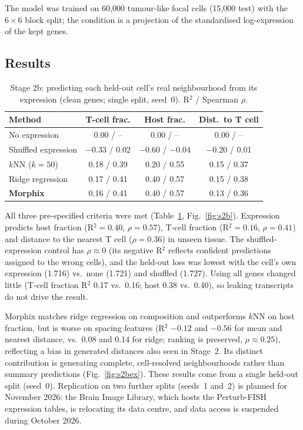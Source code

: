 \documentclass[journal]{IEEEtran}
\begin{document}
The model was trained on 60{,}000 tumour-like focal cells (15{,}000 test) with the $6\times6$ block split; the condition is a projection of the standardised log-expression of the kept genes.

\subsection{Results}

\begin{table}[!t]
\centering
\caption{Stage 2b: predicting each held-out cell's real neighbourhood from its expression (clean genes; single split, seed~0). R$^2$ / Spearman $\rho$.}
\label{tab:s2b}
\footnotesize
\setlength{\tabcolsep}{3pt}
\begin{tabular}{lccc}
\toprule
Method & T-cell frac. & Host frac. & Dist.\ to T cell \\
\midrule
No expression       & 0.00 / -- & 0.00 / -- & 0.00 / -- \\
Shuffled expression & $-0.33$ / 0.02 & $-0.60$ / $-0.04$ & $-0.20$ / 0.01 \\
$k$NN ($k=50$)      & 0.18 / 0.39 & 0.20 / 0.55 & 0.15 / 0.37 \\
Ridge regression    & 0.17 / 0.41 & 0.40 / 0.57 & 0.15 / 0.38 \\
\textbf{Morphix}    & 0.16 / 0.41 & 0.40 / 0.57 & 0.13 / 0.36 \\
\bottomrule
\end{tabular}
\end{table}

All three pre-specified criteria were met (Table~\ref{tab:s2b}, Fig.~\ref{fig:s2b}). Expression predicts host fraction (R$^2=0.40$, $\rho=0.57$), T-cell fraction (R$^2=0.16$, $\rho=0.41$) and distance to the nearest T cell ($\rho=0.36$) in unseen tissue. The shuffled-expression control has $\rho\approx0$ (its negative R$^2$ reflects confident predictions assigned to the wrong cells), and the held-out loss was lowest with the cell's own expression (1.716) vs.\ none (1.721) and shuffled (1.727). Using all genes changed little (T-cell fraction R$^2$ 0.17 vs.\ 0.16; host 0.38 vs.\ 0.40), so leaking transcripts do not drive the result.

Morphix matches ridge regression on composition and outperforms $k$NN on host fraction, but is worse on spacing features (R$^2$ $-0.12$ and $-0.56$ for mean and nearest distance, vs.\ 0.08 and 0.14 for ridge; ranking is preserved, $\rho\approx0.25$), reflecting a bias in generated distances also seen in Stage~2. Its distinct contribution is generating complete, cell-resolved neighbourhoods rather than summary predictions (Fig.~\ref{fig:s2bex}). These results come from a single held-out split (seed~0). Replication on two further splits (seeds~1 and~2) is planned for November 2026: the Brain Image Library, which hosts the Perturb-FISH expression tables, is relocating its data centre, and data access is suspended during October 2026.
\end{document}
